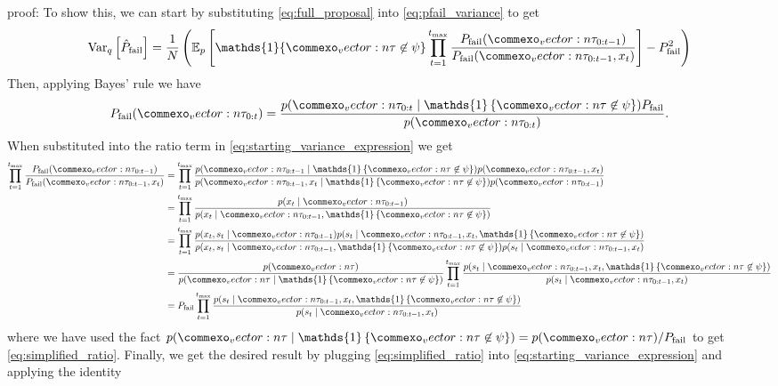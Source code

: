 proof:
To show this, we can start by substituting \cref{eq:full_proposal} into \cref{eq:pfail_variance} to get
\begin{equation}
    \text{Var}_q\left[ \hat{P}_{\rm fail} \right] = \frac{1}{N} \left(\mathbb{E}_p \left[\mathds{1}\{ \vec{\tau} \not \in \psi \} \prod_{t=1}^{t_{\rm max}} \frac{P_{\rm fail}(\vec{\tau}_{0:t-1})}{P_{\rm fail}(\vec{\tau}_{0:t-1}, x_t)} \right] - P_{\rm fail}^2 \right) \label{eq:starting_variance_expression}
\end{equation}
Then, applying Bayes' rule we have 
\begin{equation}
    P_{\rm fail}(\vec{\tau}_{0:t}) = \frac{p(\vec{\tau}_{0:t} \mid \mathds{1} \left\{ \vec{\tau} \not \in \psi \right\}) P_{\rm fail}}{p(\vec{\tau}_{0:t})} \text{.}
\end{equation}
When substituted into the ratio term in \cref{eq:starting_variance_expression} we get
\begin{align}
    \prod_{t=1}^{t_{\rm max}} \frac{P_{\rm fail}(\vec{\tau}_{0:t-1})}{P_{\rm fail}(\vec{\tau}_{0:t-1}, x_t)} &= \prod_{t=1}^{t_{\rm max}} \frac{p(\vec{\tau}_{0:t-1} \mid \mathds{1} \left\{ \vec{\tau} \not \in \psi \right\}) p(\vec{\tau}_{0:t-1}, x_t)}{p(\vec{\tau}_{0:t-1}, x_t \mid \mathds{1} \left\{ \vec{\tau} \not \in \psi \right\}) p(\vec{\tau}_{0:t-1})} \\
    &= \prod_{t=1}^{t_{\rm max}} \frac{p(x_t \mid \vec{\tau}_{0:t-1})}{p(x_t \mid \vec{\tau}_{0:t-1}, \mathds{1} \left\{ \vec{\tau} \not \in \psi \right\})} \\
    &= \prod_{t=1}^{t_{\rm max}} \frac{p(x_t, s_t \mid \vec{\tau}_{0:t-1})p(s_t \mid \vec{\tau}_{0:t-1}, x_t, \mathds{1} \left\{ \vec{\tau} \not \in \psi \right\})}{p(x_t, s_t \mid \vec{\tau}_{0:t-1}, \mathds{1} \left\{ \vec{\tau} \not \in \psi \right\})p(s_t \mid \vec{\tau}_{0:t-1}, x_t)} \\
    &= \frac{p(\vec{\tau})}{p(\vec{\tau} \mid \mathds{1} \left\{ \vec{\tau} \not \in \psi \right\})} \prod_{t=1}^{t_{\rm max}} \frac{p(s_t \mid \vec{\tau}_{0:t-1}, x_t, \mathds{1} \left\{ \vec{\tau} \not \in \psi \right\})}{p(s_t \mid \vec{\tau}_{0:t-1}, x_t)} \\
    &= P_{\rm fail}\prod_{t=1}^{t_{\rm max}} \frac{p(s_t \mid \vec{\tau}_{0:t-1}, x_t, \mathds{1} \left\{ \vec{\tau} \not \in \psi \right\})}{p(s_t \mid \vec{\tau}_{0:t-1}, x_t)} \label{eq:simplified_ratio}
\end{align}
where we have used the fact $p(\vec{\tau} \mid \mathds{1} \left\{ \vec{\tau} \not \in \psi \right\}) =  p (\vec{\tau})/P_{\rm fail}$ to get \cref{eq:simplified_ratio}. Finally, we get the desired result by plugging \cref{eq:simplified_ratio} into \cref{eq:starting_variance_expression} and applying the identity

